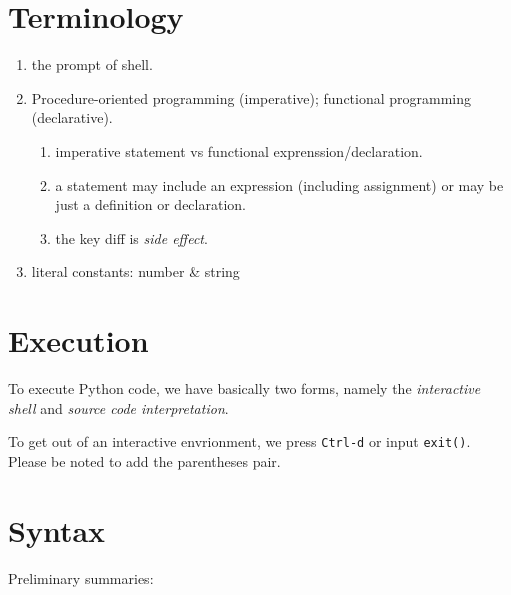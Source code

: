 \section{Terminology}
\label{sec:py-terminology}

\begin{enumerate}
\item the prompt of shell.
\item Procedure-oriented programming (imperative); functional
  programming (declarative).
  \begin{enumerate}
  \item imperative statement vs functional exprenssion/declaration.
  \item a statement may include an expression (including
    assignment) or may be just a definition or declaration.
  \item the key diff is \textit{side effect}.
  \end{enumerate}
\item literal constants: number \& string
\end{enumerate}

\section{Execution}
\label{sec:py-execution}

To execute Python code, we have basically two forms, namely the
\textit{interactive shell} and \textit{source code
  interpretation}.

To get out of an interactive envrionment, we press \verb|Ctrl-d|
or input \verb|exit()|. Please be noted to add the parentheses pair.

\section{Syntax}
\label{sec:py-syntax}

Preliminary summaries:

